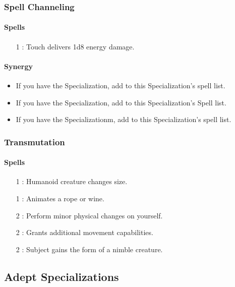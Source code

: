 \subsubsection{Spell Channeling}
\paragraph{Spells}
\begin{itemize}
 \item[1] : Touch delivers 1d8 energy damage.
\end{itemize}
\paragraph{Synergy}
\begin{itemize}
 \item If you have the  Specialization, add  to this Specialization's spell list.
 \item If you have the  Specialization, add  to this Specialization's Spell list.
 \item If you have the  Specializationm, add  to this Specialization's spell list.
\end{itemize}

\subsubsection{Transmutation}
\paragraph{Spells}
\begin{itemize}
 \item[1] : Humanoid creature changes size.
 \item[1] : Animates a rope or wine.
 \item[2] : Perform minor physical changes on yourself.
 \item[2] : Grants additional movement capabilities.
 \item[2] : Subject gains the form of a nimble creature.
\end{itemize}


\subsection{Adept Specializations}
